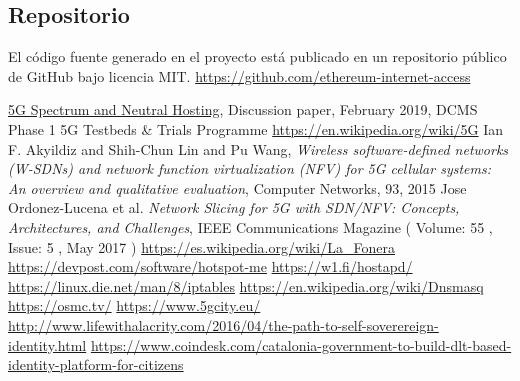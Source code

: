 \documentclass[12pt]{amsart}
\begin{document}
\begin{multicols}{2}
\section{Repositorio}\label{sec:repository}
El código fuente generado en el proyecto está publicado en un repositorio público de GitHub bajo licencia MIT.
\newline\newline
\url{https://github.com/ethereum-internet-access}
\newline
\begin{thebibliography}{9}
  \href{https://uk5g.org/media/uploads/resource_files/Spectrum\_NH\_discussion\_paper\_20Feb19.pdf}{5G Spectrum and Neutral Hosting}, Discussion paper, February 2019,
  DCMS Phase 1 5G Testbeds \& Trials Programme
 \href{https://en.wikipedia.org/wiki/5G}{https://en.wikipedia.org/wiki/5G}
 Ian F. Akyildiz and Shih-Chun Lin and Pu Wang,
  \textit{Wireless software-defined networks (W-SDNs) and network function virtualization (NFV) for 5G cellular systems:
    An overview and qualitative evaluation}, Computer Networks, 93, 2015
 Jose Ordonez-Lucena et al.
  \textit{Network Slicing for 5G with SDN/NFV: Concepts, Architectures, and Challenges},
   IEEE Communications Magazine ( Volume: 55 , Issue: 5 , May 2017 )
 \href{https://es.wikipedia.org/wiki/La_Fonera}{https://es.wikipedia.org/wiki/La\_Fonera}
 \href{https://devpost.com/software/hotspot-me}{https://devpost.com/software/hotspot-me}
 \href{https://w1.fi/hostapd/}{https://w1.fi/hostapd/}
 \href{https://linux.die.net/man/8/iptables}{https://linux.die.net/man/8/iptables}
 \href{https://en.wikipedia.org/wiki/Dnsmasq}{https://en.wikipedia.org/wiki/Dnsmasq}
 \href{https://osmc.tv/}{https://osmc.tv/}
 \href{https://www.5gcity.eu/}{https://www.5gcity.eu/}
  \href{Christopher Allen, The path to self sovereign identity, 2016}
  {http://www.lifewithalacrity.com/2016/04/the-path-to-self-soverereign-identity.html}
  \href{Catalonia to Build DLT-Based Identity, Coindesk, 2019}{https://www.coindesk.com/catalonia-government-to-build-dlt-based-identity-platform-for-citizens}



\end{thebibliography}
\end{multicols}
\end{document}
